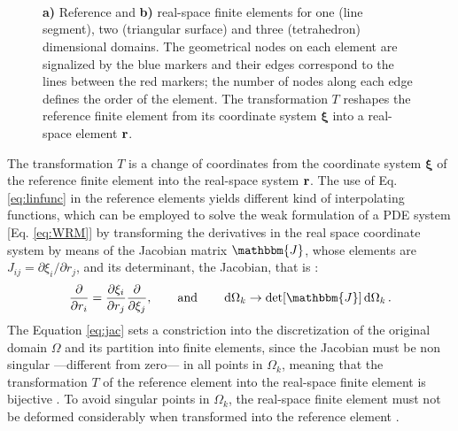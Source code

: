  \begin{figure}[h!]
    \centering
    \small
        \def\svgwidth{.8\textwidth}
        \vspace*{-15em}\\
    \hspace*{-.8\textwidth}
        \begin{subfigure}{\textwidth}\caption{ }\label{fig:FinEleEx:a}\end{subfigure}
        \vspace*{5em}\\
    \hspace*{-.8\textwidth}
        \begin{subfigure}{\textwidth}\caption{ }\label{fig:FinEleEx:b}\end{subfigure}
    \vspace*{6em}\\
 \caption[References an Real-space Finite Elements]{ \textbf{a)} Reference and \textbf{b)} real-space finite elements for one (line segment), two (triangular surface) and three (tetrahedron) dimensional domains. The geometrical nodes on each element are signalized by the blue markers and their edges correspond to the lines between the red markers; the number of nodes along each edge defines the order of the element. The transformation $T$ reshapes the reference finite element from its coordinate system $\boldsymbol{\xi}$ into a real-space element $\vb{r}$. }
\label{fig:FinEleEx}
\end{figure}

The transformation $T$ is a change of coordinates from the coordinate system $\boldsymbol{\xi}$  of the reference finite element into the real-space system $\vb{r}$. The use of Eq. \eqref{eq:linfunc} in the reference elements yields different kind of interpolating functions, which can be employed to solve the weak formulation of a PDE system [Eq. \eqref{eq:WRM}] by transforming the derivatives in the real space coordinate system by means of the Jacobian matrix $\mathbbm{J}$, whose elements are $J_{ij} = \partial \xi_i/\partial r_j$, and its determinant, the Jacobian, that is \cite{dhatt_finite_2012,fletcher_computational_1984}:
%
\begin{align}
    \pdv{r_i} = \pdv{\xi_i}{r_j} \pdv{\xi_j},
    \qquad
    \text{and}
    \qquad
    \dd{\Omega_k} \to \det[\mathbbm{J}]\dd{\Omega_k}.
\label{eq:jac}
\end{align}
%
The Equation \eqref{eq:jac} sets a constriction into the discretization of the original domain $\Omega$ and its partition into finite elements, since the Jacobian must be non singular ---different from zero--- in all points in $\Omega_k$, meaning that the transformation $T$ of the reference element into the real-space finite element is bijective \cite{dhatt_finite_2012,fletcher_computational_1984}. To avoid singular points in $\Omega_k$, the real-space finite element must not be deformed considerably when transformed into the reference element \cite{dhatt_finite_2012}.


